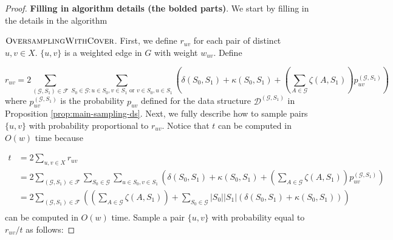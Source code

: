 \begin{proof}

\textbf{Filling in algorithm details (the bolded parts)}. We start by filling in the details in the algorithm

\noindent $\textsc{OversamplingWithCover}$. First, we define $r_{uv}$ for each pair of distinct $u,v\in X$. $\{u,v\}$ is a weighted edge in $G$ with weight $w_{uv}$. Define

$$r_{uv} = 2\sum_{(\mathcal G,S_1)\in \mathcal F}\sum_{S_0\in \mathcal G: u\in S_0,v\in S_1 \text{ or } v\in S_0,u\in S_1} \left(\delta(S_0,S_1) + \kappa(S_0,S_1) + \left(\sum_{A\in \mathcal G} \zeta(A,S_1)\right) p_{uv}^{(\mathcal G,S_1)}\right)$$
where $p_{uv}^{(\mathcal G,S_1)}$ is the probability $p_{uv}$ defined for the data structure $\mathcal D^{(\mathcal G,S_1)}$ in Proposition \ref{prop:main-sampling-ds}. Next, we fully describe how to sample pairs $\{u,v\}$ with probability proportional to $r_{uv}$. Notice that $t$ can be computed in $O(w)$ time because

\begin{align*}
t &= 2\sum_{u,v\in X} r_{uv}\\
&= 2\sum_{(\mathcal G,S_1)\in \mathcal F} \sum_{S_0\in \mathcal G} \sum_{u\in S_0,v\in S_1} \left(\delta(S_0,S_1) + \kappa(S_0,S_1) + \left(\sum_{A\in \mathcal G} \zeta(A,S_1)\right) p_{uv}^{(\mathcal G,S_1)}\right)\\
&= 2\sum_{(\mathcal G,S_1)\in \mathcal F} \left(\left(\sum_{A\in \mathcal G} \zeta(A,S_1)\right) + \sum_{S_0\in \mathcal G} |S_0||S_1|(\delta(S_0,S_1) + \kappa(S_0,S_1))\right)\\
\end{align*}
can be computed in $O(w)$ time. Sample a pair $\{u,v\}$ with probability equal to $r_{uv}/t$ as follows:


\end{proof}
